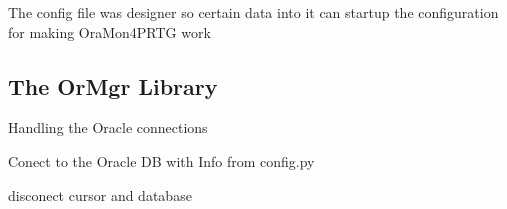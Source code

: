 \documentclass[letterpaper,10pt,english]{sphinxmanual}
\begin{document}

\begin{fulllineitems}
\label{api:config.config}
\end{fulllineitems}


The config file was designer so certain data into it can
startup the configuration for making OraMon4PRTG work
\begin{quote}

\begin{fulllineitems}
\end{fulllineitems}


\begin{fulllineitems}
\label{api:config.TableSpaces}
\end{fulllineitems}

\end{quote}


\subsection{The OrMgr Library}
\label{api:module-OrMgr}\label{api:the-ormgr-library}

\begin{fulllineitems}
\label{api:OrMgr.OrMgr}
Handling the Oracle connections

\begin{fulllineitems}
\label{api:OrMgr.OrMgr.db_connect}
Conect to the Oracle DB with Info from config.py

\end{fulllineitems}


\begin{fulllineitems}
\label{api:OrMgr.OrMgr.db_close}
disconect cursor and database

\end{fulllineitems}


\end{fulllineitems}
\end{document}
